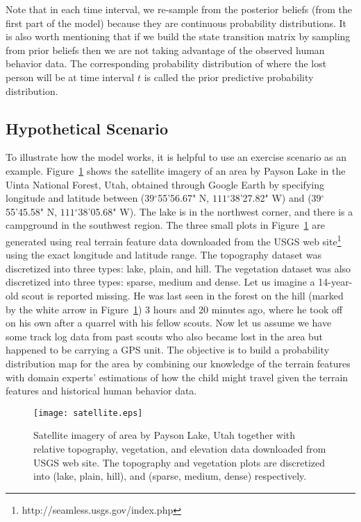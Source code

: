 \documentclass[smallextended,natbib]{svjour3}
\newcommand{\degree}{\ensuremath{^\circ}}
\begin{document}
Note that in each time interval, we re-sample from the posterior beliefs (from the first part of the model) because they are continuous probability distributions. It is also worth mentioning that if we build the state transition matrix by sampling from prior beliefs then we are not taking advantage of the observed human behavior data. The corresponding probability distribution of where the lost person will be at time interval $t$ is called the prior predictive probability distribution.

\subsection{Hypothetical Scenario}
\label{sec:3.2}

To illustrate how the model works, it is helpful to use an exercise scenario as an example. Figure~\ref{satellite} shows the satellite imagery of an area by Payson Lake in the Uinta National Forest, Utah, obtained through Google Earth by specifying longitude and latitude between ($39\degree$55'56.67" N, $111\degree$38'27.82" W) and ($39\degree$55'45.58" N, $111\degree$38'05.68" W). The lake is in the northwest corner, and there is a campground in the southwest region. The three small plots in Figure~\ref{satellite} are generated using real terrain feature data downloaded from the USGS web site\footnote {http://seamless.usgs.gov/index.php} using the exact longitude and latitude range. The topography dataset was discretized into three types: lake, plain, and hill. The vegetation dataset was also discretized into three types: sparse, medium and dense. Let us imagine a 14-year-old scout is reported missing. He was last seen in the forest on the hill (marked by the white arrow in Figure~\ref{satellite}) 3 hours and 20 minutes ago, where he took off on his own after a quarrel with his fellow scouts. Now let us assume we have some track log data from past scouts who also became lost in the area but happened to be carrying a GPS unit. The objective is to build a probability distribution map for the area by combining our knowledge of the terrain features with domain experts' estimations of how the child might travel given the terrain features and historical human behavior data.

\begin{figure}
\centering
\texttt{[image: satellite.eps]}
\caption[Satellite imagery and terrain data of area by Payson Lake, Utah]{Satellite imagery of area by Payson Lake, Utah together with relative topography, vegetation, and elevation data downloaded from USGS web site. The topography and vegetation plots are discretized into (lake, plain, hill), and (sparse, medium, dense) respectively.}
\label{satellite}
\end{figure}
\end{document}
